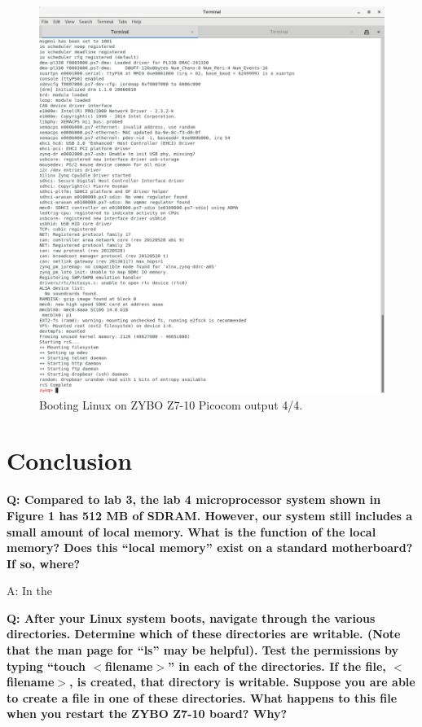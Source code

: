 \documentclass[11pt,letterpaper,titlepage]{article}
\begin{document}
\newpage

\begin{figure}[h!]
    \centering
    \includegraphics[width=\textwidth]{boot_4.png}
    \caption{Booting Linux on ZYBO Z7-10 Picocom output 4/4.}
\end{figure}

\newpage

\part{Conclusion}

\textbf{Q: Compared to lab 3, the lab 4 microprocessor system shown in Figure 1 has 512 MB of SDRAM. However, our system still includes a small amount of local memory. What is the function of the local memory? Does this ``local memory'' exist on a standard motherboard? If so, where?}

A: In the 

\textbf{Q: After your Linux system boots, navigate through the various directories. Determine which of these directories are writable. (Note that the man page for ``ls'' may be helpful). Test the permissions by typing ``touch $<$filename$>$'' in each of the directories. If the file, $<$filename$>$, is created, that directory is writable. Suppose you are able to create a file in one of these directories. What happens to this file when you restart the ZYBO Z7-10 board? Why?}
\end{document}

